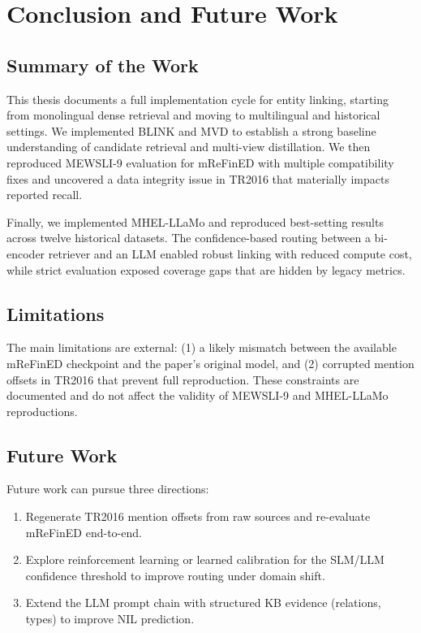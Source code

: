 \chapter{Conclusion and Future Work}
\label{ch:conclusion}

\section{Summary of the Work}
This thesis documents a full implementation cycle for entity linking, starting from monolingual dense retrieval and moving to multilingual and historical settings. We implemented BLINK and MVD to establish a strong baseline understanding of candidate retrieval and multi-view distillation. We then reproduced MEWSLI-9 evaluation for mReFinED with multiple compatibility fixes and uncovered a data integrity issue in TR2016 that materially impacts reported recall.

Finally, we implemented MHEL-LLaMo and reproduced best-setting results across twelve historical datasets. The confidence-based routing between a bi-encoder retriever and an LLM enabled robust linking with reduced compute cost, while strict evaluation exposed coverage gaps that are hidden by legacy metrics.

\section{Limitations}
The main limitations are external: (1) a likely mismatch between the available mReFinED checkpoint and the paper's original model, and (2) corrupted mention offsets in TR2016 that prevent full reproduction. These constraints are documented and do not affect the validity of MEWSLI-9 and MHEL-LLaMo reproductions.

\section{Future Work}
Future work can pursue three directions:
\begin{enumerate}
	\item Regenerate TR2016 mention offsets from raw sources and re-evaluate mReFinED end-to-end.
	\item Explore reinforcement learning or learned calibration for the SLM/LLM confidence threshold to improve routing under domain shift.
	\item Extend the LLM prompt chain with structured KB evidence (relations, types) to improve NIL prediction.
\end{enumerate}
